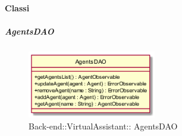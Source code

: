 \paragraph{Classi}
\hypertarget{ AgentsDAO_label}{\subparagraph{ AgentsDAO}}
\begin{figure}[h]
	\centering
	\includegraphics[width=0.50\textwidth,height=\textheight,keepaspectratio]{images/ClassAgentsDAO.png}
	\caption{Back-end::VirtualAssistant:: AgentsDAO}
\end{figure}
